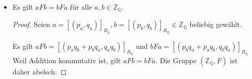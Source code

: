 \documentclass[12pt]{extarticle}
\begin{document}
\begin{itemize}
\begin{proof}
    Für alle \((m_1,n_1) \in [(0,-q_a^2)]_{R_{\mathbb{Q}}}\) gilt
    \(m_1 \cdot -q_a^2 = n_1 \cdot 0 = 0\).  Wegen \(q_a \neq 0\) gilt
    \(m_1 =0\).  Für alle \((m_2,n_2) \in [(0,1)]_{R_{\mathbb{Q}}}\) gilt
    \(m_2 \cdot 1 = n_2 \cdot 0 = 0\).  Wegen \(1 \neq 0\) gilt \(m_2 =0\).
    Es gilt für alle \((m_1,n_1) \in [(0,1)]_{R_{\mathbb{Q}}}\) und alle
    \((m_2,n_2) \in [(0,-q_a^2)]_{R_{\mathbb{Q}}}\) dass \(m_1, m_2=0\)
    sein muss und
    \(n_1, n_2 \in \mathbb{Z} \setminus \left\{ 0 \right\}\) beliebig.
    Daher gilt
    \([(0,-q_a^2)]_{R_{\mathbb{Q}}} = [(0,1)]_{R_{\mathbb{Q}}}\).
  \end{proof}
\item Es gilt \(aFb=bFa\) für alle \(a,b \in \mathbb{Z}_{\mathbb{Q}}\).
  \begin{proof}
    Seien
    $a = [(p_a,q_a)]_{R_{\mathbb{Q}}}, b =
    [(p_b,q_b)]_{R_{\mathbb{Q}}} \in \mathbb{Z}_{\mathbb{Q}}$ beliebig
    gewählt.

    Es gilt \(aFb = [(p_aq_b+p_bq_a, q_aq_b)]_{R_{\mathbb{Q}}}\) und
    \(bFa = [(p_bq_a+p_aq_b, q_bq_a)]_{R_{\mathbb{Q}}}\) Weil Addition
    kommutativ ist, gilt \(aFb=bFa\).  Die Gruppe
    \((\mathbb{Z}_{\mathbb{Q}}, F)\) ist daher abelsch.
  \end{proof}
\end{itemize}
\end{document}
